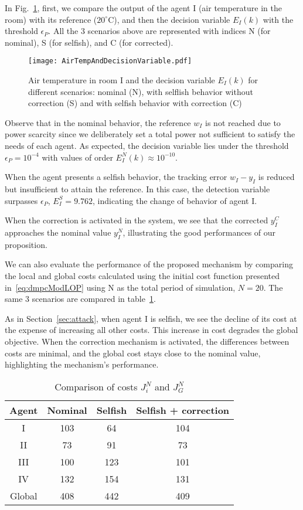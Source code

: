 \documentclass[a4paper, 10 pt, conference]{ieeeconf}  %
\begin{document}
In Fig.~\ref{fig:response3Scenarios}, first, we compare the output of the agent I
(air temperature in the room) with its reference ($20^{\circ}$C), and then the
decision variable ${E_{I}(k)}$ with the threshold $\epsilon_{P}$.
All the 3 scenarios above are represented with indices N (for nominal), S (for selfish), and C (for corrected).

\begin{figure}[t]
  \centering
  \texttt{[image: AirTempAndDecisionVariable.pdf]}
\caption{Air temperature in room I and the decision variable $E_{I}(k)$ for
different scenarios: nominal (N), with selflish behavior without correction (S)
and with selfish behavior with correction (C)}\label{fig:response3Scenarios}
\end{figure}
Observe that in the nominal behavior, the reference $w_{I}$ is not reached
due to power scarcity since we deliberately set a total power not sufficient to
satisfy the needs of each agent.
As expected, the decision variable lies under the threshold $\epsilon_{P}=10^{-4}$ with values of order ${E_{I}^{N}(k)\approx10^{-10}}$.


When the agent presents a selfish behavior, the tracking error
${w_{I}-y_{I}}$ is reduced but insufficient to attain the reference.
In this case, the detection variable surpasses $\epsilon_{P}$,
${E_{I}^{S}=9.762}$, indicating the change of behavior of agent I.

When the correction is activated in the system, we see that the corrected
$y_{I}^{C}$ approaches the nominal value $y_{I}^{N}$, illustrating the good
performances of our proposition.

We can also evaluate the performance of the proposed mechanism by comparing the
local and global costs calculated using the initial cost function presented
in~\eqref{eq:dmpcModLOP} using N as the total period of simulation, ${N=20}$.
The same 3 scenarios are compared in table~\ref{tab:costsGlobalLocal}.

As in Section~\ref{sec:attack}, when agent I is selfish, we see the decline of its cost at the expense of increasing all other costs. This increase in cost degrades the global objective.
When the correction mechanism is activated, the differences between costs are minimal, and the global cost stays close to the nominal value, highlighting the mechanism's performance.
\begin{table}[t]
  \centering
  \caption{Comparison of costs $J_{i}^{N}$ and $J_{G}^{N}$}\label{tab:costsGlobalLocal}
  \begin{tabular}[t]{cccc} \toprule
    Agent  & Nominal & Selfish & Selfish + correction\\
    \midrule
    I      & 103  &  64  & 104  \\
    II     &  73  &  91  &  73  \\
    III    & 100  & 123  & 101  \\
    IV     & 132  & 154  & 131  \\
    Global & 408  & 442  & 409  \\
    \bottomrule
  \end{tabular}
\end{table}
\enlargethispage{-.8cm}
\end{document}
